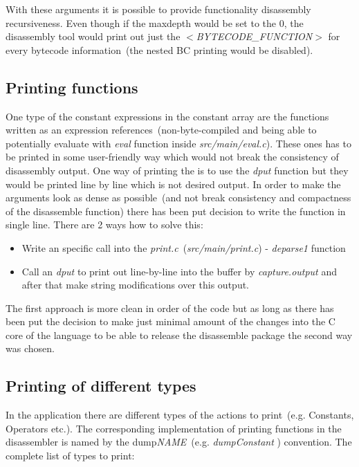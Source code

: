 \documentclass[thesis=M,english]{FITthesis}[2018/10/20]
\begin{document}
With these arguments it is possible to provide functionality disassembly recursiveness. Even though if the maxdepth would be set to the 0, the disassembly tool would print out just the \textit{$<$BYTECODE{\_}FUNCTION$>$} for every bytecode information~(the nested BC printing would be disabled).

\subsection{Printing functions}

One type of the constant expressions in the constant array are the functions written as an expression references~(non-byte-compiled and being able to potentially evaluate with \textit{eval} function inside \textit{src/main/eval.c}). These ones has to be printed in some user-friendly way which would not break the consistency of disassembly output. One way of printing the is to use the \textit{dput} function but they would be printed line by line which is not desired output. In order to make the arguments look as dense as possible~(and not break consistency and compactness of the disassemble function) there has been put decision to write the function in single line. There are 2 ways how to solve this:

\begin{itemize}
	\item Write an specific call into the \textit{print.c}~(\textit{src/main/print.c}) - \textit{deparse1} function
	\item Call an \textit{dput} to print out line-by-line into the buffer by \textit{capture.output} and after that make string modifications over this output.
\end{itemize}

The first approach is more clean in order of the code but as long as there has been put the decision to make just minimal amount of the changes into the C core of the language to be able to release the disassemble package the second way was chosen.


\subsection{Printing of different types}

In the application there are different types of the actions to print~(e.g. Constants, Operators etc.). The corresponding implementation of printing functions in the disassembler is named by the dump\textit{NAME}~(e.g. \textit{dumpConstant} ) convention. The complete list of types to print:
\end{document}
